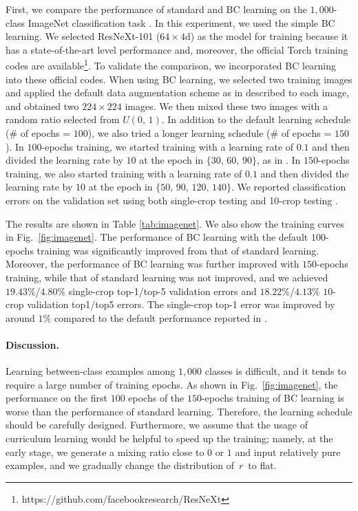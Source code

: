 \documentclass[10pt,twocolumn,letterpaper]{article}
\begin{document}
First, we compare the performance of standard and BC learning on the $1{,}000$-class ImageNet classification task \cite{russakovsky2015imagenet}. In this experiment, we used the simple BC learning. We selected ResNeXt-101 ($64\times4$d) \cite{xie2017aggregated} as the model for training because it has a state-of-the-art level performance and, moreover, the official Torch \cite{collobert2002torch} training codes are available\footnote{https://github.com/facebookresearch/ResNeXt}. To validate the comparison, we incorporated BC learning into these official codes. When using BC learning, we selected two training images and applied the default data augmentation scheme as in described \cite{xie2017aggregated} to each image, and obtained two $224\times224$ images. We then mixed these two images with a random ratio selected from $U(0, \, 1)$. In addition to the default learning schedule (\# of epochs = $100$), we also tried a longer learning schedule (\# of epochs = $150$). In $100$-epochs training, we started training with a learning rate of $0.1$ and then divided the learning rate by $10$ at the epoch in $\{30,\, 60,\, 90\}$, as in \cite{xie2017aggregated}. In $150$-epochs training, we also started training with a learning rate of $0.1$ and then divided the learning rate by $10$ at the epoch in $\{50,\, 90,\, 120,\, 140\}$. We reported classification errors on the validation set using both single-crop testing \cite{xie2017aggregated} and 10-crop testing \cite{krizhevsky2012imagenet}.

The results are shown in Table \ref{tab:imagenet}. We also show the training curves in Fig.~\ref{fig:imagenet}. The performance of BC learning with the default $100$-epochs training was significantly improved from that of standard learning. Moreover, the performance of BC learning was further improved with $150$-epochs training, while that of standard learning was not improved, and we achieved $19.43\%$/$4.80\%$ single-crop top-1/top-5 validation errors and $18.22\%$/$4.13\%$ $10$-crop validation top1/top5 errors. The single-crop top-1 error was improved by around $1\%$ compared to the default performance reported in \cite{xie2017aggregated}.

\paragraph{Discussion.}
Learning between-class examples among $1{,}000$ classes is difficult, and it tends to require a large number of training epochs. As shown in Fig.~\ref{fig:imagenet}, the performance on the first $100$ epochs of the $150$-epochs training of BC learning is worse than the performance of standard learning. Therefore, the learning schedule should be carefully designed. Furthermore, we assume that the usage of curriculum learning \cite{bengio2009curriculum} would be helpful to speed up the training; namely, at the early stage, we generate a mixing ratio close to $0$ or $1$ and input relatively pure examples, and we gradually change the distribution of $\, r\,$ to flat.
\end{document}

